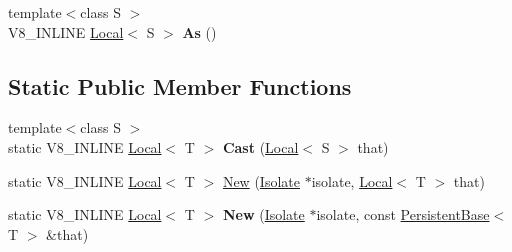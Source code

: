 \begin{DoxyCompactItemize}
\item 
{\footnotesize template$<$class S $>$ }\\V8\+\_\+\+I\+N\+L\+I\+NE \hyperlink{classv8_1_1Local}{Local}$<$ S $>$ {\bfseries As} ()\hypertarget{classv8_1_1Local_a18b55bc71ce2dcd084887097be4399eb}{}\label{classv8_1_1Local_a18b55bc71ce2dcd084887097be4399eb}

\end{DoxyCompactItemize}
\subsection*{Static Public Member Functions}
\begin{DoxyCompactItemize}
\item 
{\footnotesize template$<$class S $>$ }\\static V8\+\_\+\+I\+N\+L\+I\+NE \hyperlink{classv8_1_1Local}{Local}$<$ T $>$ {\bfseries Cast} (\hyperlink{classv8_1_1Local}{Local}$<$ S $>$ that)\hypertarget{classv8_1_1Local_a95c8aa28ad098dd160ddd8cb60377bd6}{}\label{classv8_1_1Local_a95c8aa28ad098dd160ddd8cb60377bd6}

\item 
static V8\+\_\+\+I\+N\+L\+I\+NE \hyperlink{classv8_1_1Local}{Local}$<$ T $>$ \hyperlink{classv8_1_1Local_a1b3c386fb10d9e8f67aecec9174de1fa}{New} (\hyperlink{classv8_1_1Isolate}{Isolate} $\ast$isolate, \hyperlink{classv8_1_1Local}{Local}$<$ T $>$ that)
\item 
static V8\+\_\+\+I\+N\+L\+I\+NE \hyperlink{classv8_1_1Local}{Local}$<$ T $>$ {\bfseries New} (\hyperlink{classv8_1_1Isolate}{Isolate} $\ast$isolate, const \hyperlink{classv8_1_1PersistentBase}{Persistent\+Base}$<$ T $>$ \&that)\hypertarget{classv8_1_1Local_a9ffe326224dc9b8a0b47d61b1f877741}{}\label{classv8_1_1Local_a9ffe326224dc9b8a0b47d61b1f877741}

\end{DoxyCompactItemize}
